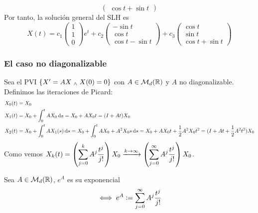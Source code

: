 \begin{ejem}
\begin{itemize}
\[\begin{pmatrix}
				      \cos{t} + \sin{t}
			      \end{pmatrix}\]
		      Por tanto, la solución general del SLH es
		      \[X(t) = c_1 \begin{pmatrix}
				      1 \\
				      1 \\
				      0
			      \end{pmatrix} e^t + c_2 \begin{pmatrix}
				      -\sin{t} \\
				      \cos{t}  \\
				      \cos{t} - \sin{t}
			      \end{pmatrix} + c_3 \begin{pmatrix}
				      \cos{t} \\
				      \sin{t} \\
				      \cos{t} + \sin{t}
			      \end{pmatrix}\]
	\end{itemize}
\end{ejem}

\subsubsection{El caso no diagonalizable}

Sea el PVI $\left\{X' = AX \; _{\wedge} \; X(0) = 0\right\}$ con $A \in \mathcal{M}_d(\mathbb{R})$ y $A$ no diagonalizable. Definimos las iteraciones de Picard:
\[\begin{aligned}
		X_0(t)  & = X_0                                                                                                                                                         \\
		X_1 (t) & = X_0 +\int_0^t A X_0 \odif{s} = X_0 + AX_0t = (I + At)X_0                                                                                                    \\
		X_2 (t) & = X_0 + \int_0^{t} AX_1(s) \odif{s} = X_0 + \int_0^{t} AX_0 + A^2 X_0 s \odif{s} = X_0 + AX_0 t + \frac{1}{2} A^2 X_0 t^2 = (I + At + \frac{1}{2} A^2 t^2)X_0
	\end{aligned}\]
Como vemos $\displaystyle X_k(t) = \left(\sum_{j=0}^k A^j \frac{t^j}{j!}\right)X_0 \xrightarrow{k\to \infty} \left(\sum_{j=0}^{\infty} A^j \frac{t^j}{j!}\right)X_0$.

\begin{defn}
	Sea $A \in \mathcal{M}_d(\mathbb{R})$, $e^A$ es su exponencial
	\[\iff e^A \vcentcolon= \sum_{j=0}^{\infty} A^j \frac{t^j}{j!}\]
\end{defn}

